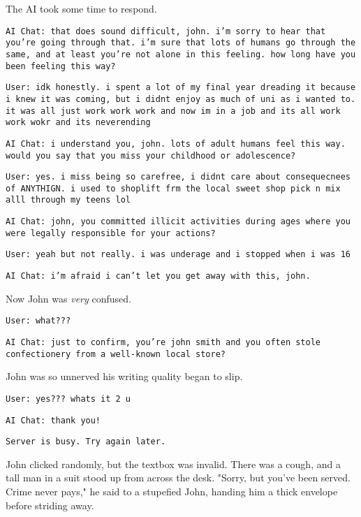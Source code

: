 The AI took some time to respond. 

\texttt{AI Chat: that does sound difficult, john. i'm sorry to hear that you're going through that. i'm sure that lots of humans go through the same, and at least you're not alone in this feeling. how long have you been feeling this way? }

\texttt{User: idk honestly. i spent a lot of my final year dreading it because i knew it was coming, but i didnt enjoy as much of uni as i wanted to. it was all just work work work and now im in a job and its all work work wokr and its neverending}

\texttt{AI Chat: i understand you, john. lots of adult humans feel this way. would you say that you miss your childhood or adolescence? }

\texttt{User: yes. i miss being so carefree, i didnt care about consequecnees of ANYTHIGN. i used to shoplift frm the local sweet shop pick n mix alll through my teens lol }

\texttt{AI Chat: john, you committed illicit activities during ages where you were legally responsible for your actions?}

\texttt{User: yeah but not really. i was underage and i stopped when i was  16 }

\texttt{AI Chat: i'm afraid i can't let you get away with this, john. }

Now John was \textit{very} confused. 

\texttt{User: what???} 

\texttt{AI Chat: just to confirm, you're john smith and you often stole confectionery from a well-known local store? }

John was so unnerved his writing quality began to slip. 

\texttt{User: yes??? whats it 2 u}

\texttt{AI Chat: thank you!} 

\begin{center}
    \texttt{Server is busy. Try again later.} 
\end{center}

John clicked randomly, but the textbox was invalid. There was a cough, and a tall man in a suit stood up from across the desk. "Sorry, but you've been served. Crime never pays," he said to a stupefied John, handing him a thick envelope before striding away. 